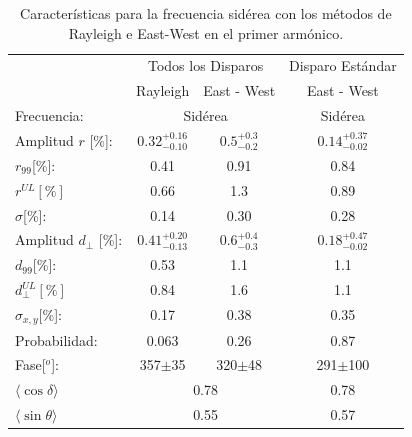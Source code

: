     \begin{table}[H]
        \begin{small}
            \begin{center}
                \begin{tabular}[c]{l|c|c||c|}
                    \cline{2-4}               &  \multicolumn{2}{c||}{Todos los Disparos}                  & Disparo Estándar      \\
                    \cline{2-4}               & Rayleigh                      & East - West                 & East - West\cite{Aab_2020}      \\\hline
\multicolumn{1}{|l|}{Frecuencia:             }& \multicolumn{2}{c||}{Sidérea}                               & Sidérea        \\ \hline
\multicolumn{1}{|l|}{Amplitud $r$ [\%]:      }& $0.32^{+0.16}_{-0.10}$ 	      & $0.5^{+0.3}_{-0.2}$         & $0.14^{+0.37}_{-0.02}$\cite{codigo}       \\
\multicolumn{1}{|l|}{$r_{99}$[\%]:           }& 0.41	                      & 0.91                        & 0.84\cite{codigo}        \\
\multicolumn{1}{|l|}{$r^{UL}[\%]$      }      & 0.66                          & 1.3                         & 0.89 \cite{codigo}        \\
\multicolumn{1}{|l|}{$\sigma$[\%]:     }      & 0.14                          & 0.30	                    & 0.28 \cite{codigo}          \\ \hline
\multicolumn{1}{|l|}{Amplitud $d_\perp$ [\%]:}& $0.41^{+0.20}_{-0.13}$        & $0.6^{+0.4}_{-0.3}$         & $0.18^{+0.47}_{-0.02}$       \\ 
\multicolumn{1}{|l|}{$d_{99}$[\%]:           }& 0.53	                      & 1.1                         & 1.1\cite{codigo}        \\
\multicolumn{1}{|l|}{$d_{\perp}^{UL}[\%]$    }& 0.84                          & 1.6                         & 1.1        \\
\multicolumn{1}{|l|}{$\sigma_{x,y}$[\%]:     }& 0.17                          & 0.38	                    & 0.35          \\ \hline
\multicolumn{1}{|l|}{Probabilidad:           }& 0.063	                      & 0.26                        & 0.87          \\
\multicolumn{1}{|l|}{Fase[$^o$]:             }& 357$\pm$35                    & 320$\pm$48                 & 291$\pm$100      \\\hline
\multicolumn{1}{|l|}{$\langle\cos\delta\rangle$} & \multicolumn{2}{c||}{0.78}                              & 0.78       \\        
\multicolumn{1}{|l|}{$\langle\sin\theta\rangle$} & \multicolumn{2}{c||}{0.55}                              & 0.57       \\ \hline       
\end{tabular}
            \end{center}
        \end{small}
        \caption{Características para la frecuencia sidérea con los métodos de Rayleigh  e East-West en el primer armónico.}
        \label{tab:siderea_3}
    \end{table}
   


